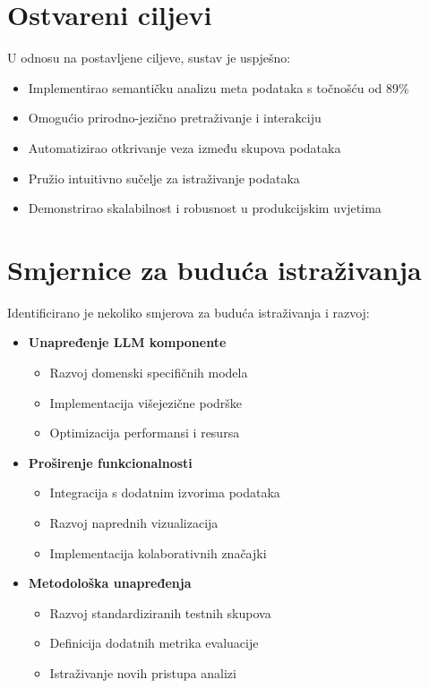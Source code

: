 \section{Ostvareni ciljevi}
\label{sec:achieved_goals}

U odnosu na postavljene ciljeve, sustav je uspješno:

\begin{itemize}
    \item Implementirao semantičku analizu meta podataka s točnošću od 89\%
    \item Omogućio prirodno-jezično pretraživanje i interakciju
    \item Automatizirao otkrivanje veza između skupova podataka
    \item Pružio intuitivno sučelje za istraživanje podataka
    \item Demonstrirao skalabilnost i robusnost u produkcijskim uvjetima
\end{itemize}

\section{Smjernice za buduća istraživanja}
\label{sec:future_work}

Identificirano je nekoliko smjerova za buduća istraživanja i razvoj:

\begin{itemize}
    \item \textbf{Unapređenje LLM komponente}
    \begin{itemize}
        \item Razvoj domenski specifičnih modela
        \item Implementacija višejezične podrške
        \item Optimizacija performansi i resursa
    \end{itemize}
    
    \item \textbf{Proširenje funkcionalnosti}
    \begin{itemize}
        \item Integracija s dodatnim izvorima podataka
        \item Razvoj naprednih vizualizacija
        \item Implementacija kolaborativnih značajki
    \end{itemize}
    
    \item \textbf{Metodološka unapređenja}
    \begin{itemize}
        \item Razvoj standardiziranih testnih skupova
        \item Definicija dodatnih metrika evaluacije
        \item Istraživanje novih pristupa analizi
    \end{itemize}
\end{itemize}

